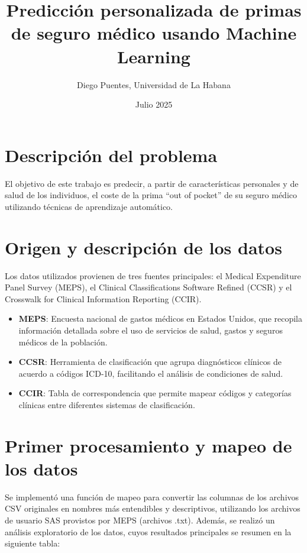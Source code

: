 \documentclass[12pt,a4paper]{article}
\title{Predicción personalizada de primas de seguro médico usando Machine Learning}
\author{Diego Puentes, Universidad de La Habana}
\date{Julio 2025}
\begin{document}
\maketitle

\section*{Descripción del problema}
El objetivo de este trabajo es predecir, a partir de características personales y de salud de los individuos, el coste de la prima ``out of pocket'' de su seguro médico utilizando técnicas de aprendizaje automático.

\section*{Origen y descripción de los datos}
Los datos utilizados provienen de tres fuentes principales: el Medical Expenditure Panel Survey (MEPS), el Clinical Classifications Software Refined (CCSR) y el Crosswalk for Clinical Information Reporting (CCIR).

\begin{itemize}
    \item \textbf{MEPS}: Encuesta nacional de gastos médicos en Estados Unidos, que recopila información detallada sobre el uso de servicios de salud, gastos y seguros médicos de la población.
    \item \textbf{CCSR}: Herramienta de clasificación que agrupa diagnósticos clínicos de acuerdo a códigos ICD-10, facilitando el análisis de condiciones de salud.
    \item \textbf{CCIR}: Tabla de correspondencia que permite mapear códigos y categorías clínicas entre diferentes sistemas de clasificación.
\end{itemize}




\section*{Primer procesamiento y mapeo de los datos}

Se implementó una función de mapeo para convertir las columnas de los archivos CSV originales en nombres más entendibles y descriptivos, utilizando los archivos de usuario SAS provistos por MEPS (archivos .txt). Además, se realizó un análisis exploratorio de los datos, cuyos resultados principales se resumen en la siguiente tabla:
\end{document}
